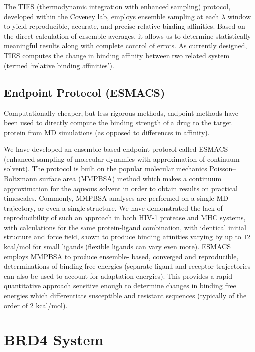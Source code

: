 \documentclass[conference]{IEEEtran}
\begin{document}
The TIES (thermodynamic integration with enhanced sampling) protocol, developed within the Coveney lab, employs ensemble sampling at each $\lambda$ window to yield reproducible, accurate, and precise relative binding affinities. 
\cite{ Wan2017brd4} Based on the direct calculation of ensemble averages, it allows us to determine statistically meaningful results along with complete control of errors. 
As currently designed, TIES computes the change in binding affinity between two related system (termed ‘relative binding affinities’).


\subsection{Endpoint Protocol (ESMACS)}\label{sec:esmacs}

Computationally cheaper, but less rigorous methods, endpoint methods have been used to directly compute the binding strength of a drug to the target protein from MD simulations (as opposed to differences in affinity). 

We have developed an ensemble-based endpoint protocol called ESMACS (enhanced sampling of molecular dynamics with approximation of continuum solvent). The protocol is built on the popular molecular mechanics Poisson–Boltzmann surface area (MMPBSA) \cite{Massova1999} method which makes a continuum approximation for the aqueous solvent in order to obtain results on practical timescales. Commonly, MMPBSA analyses are performed on a single MD trajectory, or even a single structure. We have demonstrated the lack of reproducibility of such an approach in both HIV-1 protease and MHC systems, with calculations for the same protein-ligand combination, with identical initial structure and force field, shown to produce binding affinities varying by up to 12 kcal/mol for small ligands (flexible ligands can vary even more). \cite{Wan2015} ESMACS employs MMPBSA to produce ensemble- based, converged and reproducible, determinations of binding free energies (separate ligand and receptor trajectories can also be used to account for adaptation energies). This provides a rapid quantitative approach sensitive enough to determine changes in binding free energies which differentiate susceptible and resistant sequences (typically of the order of 2 kcal/mol).

\section{BRD4 System}\label{sec:system_description}
\end{document}
